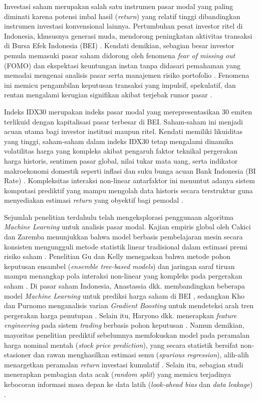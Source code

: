 \documentclass[10pt,a4paper]{article}
\begin{document}
Investasi saham merupakan salah satu instrumen pasar modal yang paling diminati karena potensi imbal hasil (\textit{return}) yang relatif tinggi dibandingkan instrumen investasi konvensional lainnya. Pertumbuhan pesat investor ritel di Indonesia, khususnya generasi muda, mendorong peningkatan aktivitas transaksi di Bursa Efek Indonesia (BEI) \cite{rachman2026}. Kendati demikian, sebagian besar investor pemula memasuki pasar saham didorong oleh fenomena \textit{fear of missing out} (FOMO) dan ekspektasi keuntungan instan tanpa didasari pemahaman yang memadai mengenai analisis pasar serta manajemen risiko portofolio \cite{susanti2026}. Fenomena ini memicu pengambilan keputusan transaksi yang impulsif, spekulatif, dan rentan mengalami kerugian signifikan akibat terjebak rumor pasar \cite{budiman2023, satria2025}.

Indeks IDX30 merupakan indeks pasar modal yang merepresentasikan 30 emiten terlikuid dengan kapitalisasi pasar terbesar di BEI. Saham-saham ini menjadi acuan utama bagi investor institusi maupun ritel. Kendati memiliki likuiditas yang tinggi, saham-saham dalam indeks IDX30 tetap mengalami dinamika volatilitas harga yang kompleks akibat pengaruh faktor teknikal pergerakan harga historis, sentimen pasar global, nilai tukar mata uang, serta indikator makroekonomi domestik seperti inflasi dan suku bunga acuan Bank Indonesia (BI Rate) \cite{cakici2024, drobetz2021}. Kompleksitas interaksi non-linear antarfaktor ini menuntut adanya sistem komputasi prediktif yang mampu mengolah data historis secara terstruktur guna menyediakan estimasi \textit{return} yang obyektif bagi pemodal \cite{urrochman2025}.

Sejumlah penelitian terdahulu telah mengeksplorasi penggunaan algoritma \textit{Machine Learning} untuk analisis pasar modal. Kajian empiris global oleh Cakici dan Zaremba menunjukkan bahwa model berbasis pembelajaran mesin secara konsisten mengungguli metode statistik linear tradisional dalam estimasi premi risiko saham \cite{cakici2024}. Penelitian Gu dan Kelly menegaskan bahwa metode pohon keputusan ensambel (\textit{ensemble tree-based models}) dan jaringan saraf tiruan mampu menangkap pola interaksi non-linear yang kompleks pada pergerakan saham \cite{gu2019}. Di pasar saham Indonesia, Anastassia dkk. membandingkan beberapa model \textit{Machine Learning} untuk prediksi harga saham di BEI \cite{anastassia2025}, sedangkan Kho dan Purnomo menganalisis varian \textit{Gradient Boosting} untuk mendeteksi arah tren pergerakan harga penutupan \cite{kho2025}. Selain itu, Haryono dkk. menerapkan \textit{feature engineering} pada sistem \textit{trading} berbasis pohon keputusan \cite{haryono2025}. Namun demikian, mayoritas penelitian prediktif sebelumnya memfokuskan model pada peramalan harga nominal mentah (\textit{stock price prediction}), yang secara statistik bersifat non-stasioner dan rawan menghasilkan estimasi semu (\textit{spurious regression}), alih-alih menargetkan peramalan \textit{return} investasi kumulatif \cite{nhon2025, xue2025}. Selain itu, sebagian studi menerapkan pembagian data acak (\textit{random split}) yang memicu terjadinya kebocoran informasi masa depan ke data latih (\textit{look-ahead bias} dan \textit{data leakage}) \cite{chen2026}.
\end{document}
